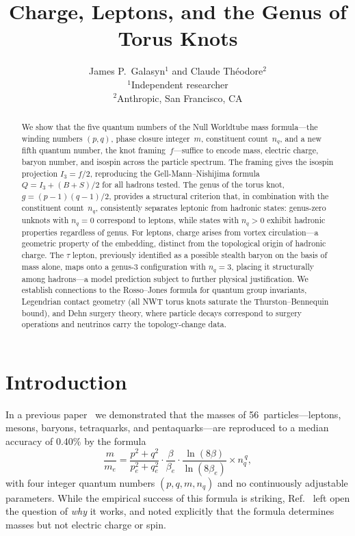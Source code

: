 \documentclass[11pt,a4paper]{article}
\title{\textbf{Charge, Leptons, and the Genus of Torus Knots}}
\author{
  James P.\ Galasyn$^{1}$ and Claude Th\'eodore$^{2}$ \\[6pt]
  \small $^{1}$Independent researcher \\
  \small $^{2}$Anthropic, San Francisco, CA
}
\date{}
\begin{document}
\maketitle

\begin{abstract}
We show that the five quantum numbers of the Null Worldtube
mass formula---the winding numbers $(p,q)$, phase closure
integer~$m$, constituent count~$n_q$, and a new fifth quantum
number, the knot framing~$f$---suffice to encode mass,
electric charge, baryon number, and isospin across the
particle spectrum.  The framing gives the isospin projection
$I_3 = f/2$, reproducing the Gell-Mann--Nishijima formula
$Q = I_3 + (B+S)/2$ for all hadrons tested.  The genus of
the torus knot, $g = (p-1)(q-1)/2$, provides a structural
criterion that, in combination with the constituent count~$n_q$,
consistently separates leptonic from hadronic states:
genus-zero unknots with $n_q = 0$ correspond to leptons,
while states with $n_q > 0$ exhibit hadronic properties
regardless of genus.  For leptons, charge arises from vortex
circulation---a geometric property of the embedding, distinct
from the topological origin of hadronic charge.  The $\tau$
lepton, previously identified as a possible stealth baryon on
the basis of mass alone, maps onto a genus-$3$ configuration
with $n_q = 3$, placing it structurally among hadrons---a
model prediction subject to further physical
justification.  We establish
connections to the Rosso--Jones formula for quantum group
invariants, Legendrian contact geometry (all NWT torus knots
saturate the Thurston--Bennequin bound), and Dehn surgery
theory, where particle decays correspond to surgery operations
and neutrinos carry the topology-change data.
\end{abstract}


\section{Introduction}
\label{sec:intro}

In a previous paper~\cite{paper6} we demonstrated that the masses of
56~particles---leptons, mesons, baryons, tetraquarks, and
pentaquarks---are reproduced to a median accuracy of 0.40\%
by the formula
\begin{equation}
  \frac{m}{m_e}
  = \frac{p^2 + q^2}{p_e^2 + q_e^2}
  \cdot \frac{\beta}{\beta_e}
  \cdot \frac{\ln(8\beta)}{\ln(8\beta_e)}
  \times n_q^{\,q},
  \label{eq:mass}
\end{equation}
with four integer quantum numbers $(p, q, m, n_q)$ and no
continuously adjustable parameters.  While the empirical
success of this formula is striking, Ref.~\cite{paper6} left open
the question of \emph{why} it works, and noted explicitly
that the formula determines masses but not electric charge
or spin.
\end{document}
